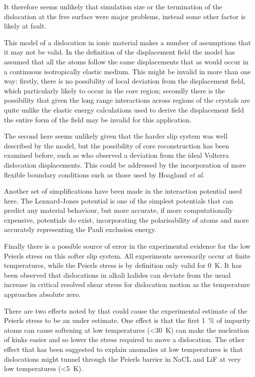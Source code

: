 It therefore seems unlikely that simulation size or the termination of the dislocation at the free surface were major problems, instead some other factor is likely at fault. 

This model of a dislocation in ionic material makes a number of assumptions that it may not be valid. In the definition of the displacement field the model has assumed that all the atoms follow the same displacements that as would occur in a continuous isotropically elastic medium. This might be invalid in more than one way: firstly, there is no possibility of local deviation from the displacement field, which particularly likely to occur in the core region; secondly there is the possibility that given the long range interactions across regions of the crystals are quite unlike the elastic energy calculations used to derive the displacement field the entire form of the field may be invalid for this application. 

The second here seems unlikely given that the harder slip system was well described by the model, but the possibility of core reconstruction has been examined before, such as \citet{Hoagland1976} who observed a deviation from the ideal Volterra dislocation displacements. This could be addressed by the incorporation of more flexible boundary conditions such as those used by Hoagland \emph{et al}.

Another set of simplifications have been made in the interaction potential used here. The Lennard-Jones potential is one of the simplest potentials that can predict any material behaviour, but more accurate, if more computationally expensive, potentials do exist, incorporating the polarisability of atoms and more accurately representing the Pauli exclusion energy.

Finally there is a possible source of error in the experimental evidence for the low Peierls stress on this softer slip system. All experiments necessarily occur at finite temperatures, while the Peierls stress is by definition only valid for \SI{0}{\kelvin}. It has been observed that dislocations in alkali halides can deviate from the usual increase in critical resolved shear stress for dislocation motion as the temperature approaches absolute zero. 

There  are two effects noted by \citet{Haasen1985} that could cause the experimental estimate of the Peierls stress to be an under estimate. One effect is that the first \SI{1}{\percent} of impurity atoms can cause softening at low temperatures (<\SI{30}{\kelvin}) can make the nucleation of kinks easier and so lower the stress required to move a dislocation. The other effect  that has been suggested to explain anomalies at low temperatures is that dislocations might tunnel through the Peierls barrier in NaCL and LiF at very low temperatures (<\SI{5}{\kelvin}).




